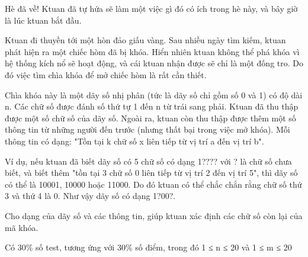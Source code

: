 Hè đã về! Ktuan đã tự hứa sẽ làm một việc gì đó có ích trong hè này, và bây giờ là lúc ktuan bắt đầu.

Ktuan đi thuyền tới một hòn đảo giấu vàng. Sau nhiều ngày tìm kiếm, ktuan phát hiện ra một chiếc hòm đã bị khóa. Hiển nhiên ktuan không thể phá khóa vì hệ thống kích nổ sẽ hoạt động, và cái ktuan nhận được sẽ chỉ là một đống tro. Do đó việc tìm chìa khóa để mở chiếc hòm là rất cần thiết.

Chìa khóa này là một dãy số nhị phân (tức là dãy số chỉ gồm số 0 và 1) có độ dài n. Các chữ số được đánh số thứ tự 1 đến n từ trái sang phải. Ktuan đã thu thập được một số chữ số của dãy số. Ngoài ra, ktuan còn thu thập được thêm một số thông tin từ những người đến trước (nhưng thất bại trong việc mở khóa). Mỗi thông tin có dạng: "Tồn tại k chữ số x liên tiếp từ vị trí a đến vị trí b".

Ví dụ, nếu ktuan đã biết dãy số có 5 chữ số có dạng 1???? với ? là chữ số chưa biết, và biết thêm "tồn tại 3 chữ số 0 liên tiếp từ vị trí 2 đến vị trí 5", thì dãy số có thể là 10001, 10000 hoặc 11000. Do đó ktuan có thể chắc chắn rằng chữ số thứ 3 và thứ 4 là 0. Như vậy dãy số có dạng 1?00?.

Cho dạng của dãy số và các thông tin, giúp ktuan xác định các chữ số còn lại của mã khóa.

Có 30\% số test, tương ứng với 30\% số điểm, trong đó 1 ≤ n ≤ 20 và 1 ≤ m ≤ 20